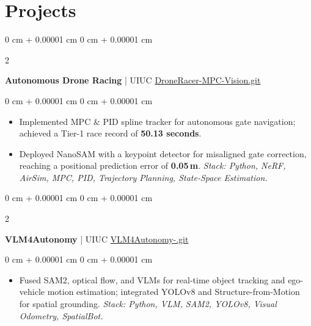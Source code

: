 \documentclass[10pt, letterpaper]{article}
\newenvironment{highlights}{
    \begin{itemize}[
        topsep=0.10 cm,
        parsep=0.10 cm,
        partopsep=0pt,
        itemsep=0pt,
        leftmargin=0 cm + 10pt
    ]
}{
    \end{itemize}
} %
\newenvironment{onecolentry}{
    \begin{adjustwidth}{
        0 cm + 0.00001 cm
    }{
        0 cm + 0.00001 cm
    }
}{
    \end{adjustwidth}
} %
\newenvironment{twocolentry}[2][]{
    \onecolentry
    \def\secondColumn{#2}
    \setcolumnwidth{\fill, 4.5 cm}
    \begin{paracol}{2}
}{
    \switchcolumn \raggedleft \secondColumn
    \end{paracol}
    \endonecolentry
} %
\begin{document}
    
    \section{Projects}

        \begin{twocolentry}{
            \href{https://github.com/muralikarteek7/DroneRacer-MPC-Vision.git}{DroneRacer-MPC-Vision.git}
        }
           {\textbf{Autonomous Drone Racing} | UIUC}\end{twocolentry}

        \vspace{0.05 cm}
        \begin{onecolentry}
            \begin{highlights}
                \item Implemented MPC \& PID spline tracker for autonomous gate navigation; achieved a Tier-1 race record of \textbf{50.13 seconds}.
                \item Deployed NanoSAM with a keypoint detector for misaligned gate correction, reaching a positional prediction error of \textbf{0.05\,m}. \textit{Stack: Python, NeRF, AirSim, MPC, PID, Trajectory Planning, State-Space Estimation.}
            \end{highlights}
        \end{onecolentry}

        \vspace{0.1 cm}

        \begin{twocolentry}{
            \href{https://github.com/muralikarteek7/VLM4Autonomy-.git}{VLM4Autonomy-.git}
        }
            {\textbf{VLM4Autonomy} | UIUC}\end{twocolentry}

        \vspace{0.05 cm}
        \begin{onecolentry}
            \begin{highlights}
                \item Fused SAM2, optical flow, and VLMs for real-time object tracking and ego-vehicle motion estimation; integrated YOLOv8 and Structure-from-Motion for spatial grounding. \textit{Stack: Python, VLM, SAM2, YOLOv8, Visual Odometry, SpatialBot.}
            \end{highlights}
        \end{onecolentry}

        \vspace{0.1 cm}
\end{document}

